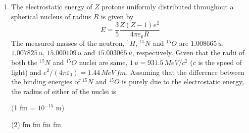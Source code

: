 \begin{enumerate}
    \item The electrostatic energy of \(Z\) protons uniformly distributed throughout a spherical nucleus of radius \(R\) is given by
    \[
    E = \frac{3}{5} \frac{Z(Z-1)e^2}{4\pi\varepsilon_0 R}
    \]
    The measured masses of the neutron, \( ^1H\), \( ^{15}N \) and \( ^{15}O \) are \(1.008665 \, u\), \(1.007825 \, u\), \(15.000109 \, u\) and \(15.003065 \, u\), respectively. Given that the radii of both the \( ^{15}N \) and \( ^{15}O \) nuclei are same, \(1 \, u = 931.5 \, MeV/c^2\) (\(c\) is the speed of light) and \(e^2/(4\pi\varepsilon_0) = 1.44 \, MeV\,fm\). Assuming that the difference between the binding energies of \( ^{15}N \) and \( ^{15}O \) is purely due to the electrostatic energy, the radius of either of the nuclei is

    (1 fm = \(10^{-15}\) m)

    \begin{tasks}(2)
         fm
         fm
         fm
         fm
    \end{tasks}
\end{enumerate}